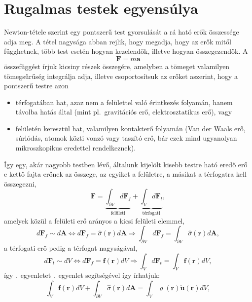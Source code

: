 \documentclass[12pt,a4paper]{scrartcl}
\let\mathbf\bm
\begin{document}
\section{Rugalmas testek egyensúlya}
Newton-tétele szerint egy pontszerű test gyorsulását a rá ható erők összessége adja meg. A tétel nagysága abban rejlik, hogy megadja, hogy az erők mitől függhetnek, több test esetén hogyan kezelendők, illetve hogyan összegezendők. A
\begin{equation} \label{eq:newton}
{\mathbf{F}} = m{\mathbf{a}}
\end{equation}
összefüggést írjuk kicsiny részek összegére, amelyben a tömeget valamilyen tömegsűrűség integrálja adja, illetve csoportosítsuk az erőket aszerint, hogy a pontszerű testre azon
\begin{itemize}
\item térfogatában hat, azaz nem a felülettel való érintkezés folyamán, hanem távolba hatás által (mint pl.\ gravitációs erő, elektrosztatikus erő), vagy
\item felületén keresztül hat, valamilyen kontakterő folyamán (Van der Waals erő, súrlódás, atomok közti vonzó vagy taszító erő, bár ezek mind ugyanolyan mikroszkopikus eredettel rendelkeznek).
\end{itemize}
Így egy, akár nagyobb testben lévő, általunk kijelölt kisebb testre ható eredő erő e kettő fajta erőnek az összege, az egyiket a felületre, a másikat a térfogatra kell összegezni,
\begin{equation} \label{eq:erok_csop}
{\mathbf{F}} = \underbrace {\int_{\partial V} {d{{\mathbf{F}}_f}} }_{{\text{felületi}}} + \underbrace {\int_V {d{{\mathbf{F}}_t}} }_{\text{térfogati}},
\end{equation}
amelyek közül a felületi erő arányos a kicsi felületi elemmel,
\[d{{\mathbf{F}}_f} \sim d{\mathbf{A}} \Leftrightarrow d{{\mathbf{F}}_f} = \hat \sigma \left( {\mathbf{r}} \right)d{\mathbf{A}} \Rightarrow \int_{\partial V} {d{{\mathbf{F}}_f}}  = \int_{\partial V} {\hat \sigma \left( {\mathbf{r}} \right)d{\mathbf{A}}},\]
a térfogati erő pedig a térfogat nagyságával,
\[d{{\mathbf{F}}_t} \sim dV \Leftrightarrow d{{\mathbf{F}}_f} = {\mathbf{f}}\left( {\mathbf{r}} \right)dV \Rightarrow \int_V {d{{\mathbf{F}}_t}}  = \int_V {{\mathbf{f}}\left( {\mathbf{r}} \right)dV},\]
így \az{\eqref{eq:newton}}.\ egyenletet \az{\eqref{eq:erok_csop}}.\ egyenlet segítségével így írhatjuk:
\[\int_V {{\mathbf{f}}\left( {\mathbf{r}} \right)dV}  + \int_{\partial V} {\hat \sigma \left( {\mathbf{r}} \right)d{\mathbf{A}}}  = \int_V {\varrho \left( {\mathbf{r}} \right){\mathbf{\ddot u\left({\mathbf{r}}\right)}}dV} ,\]
\end{document}
